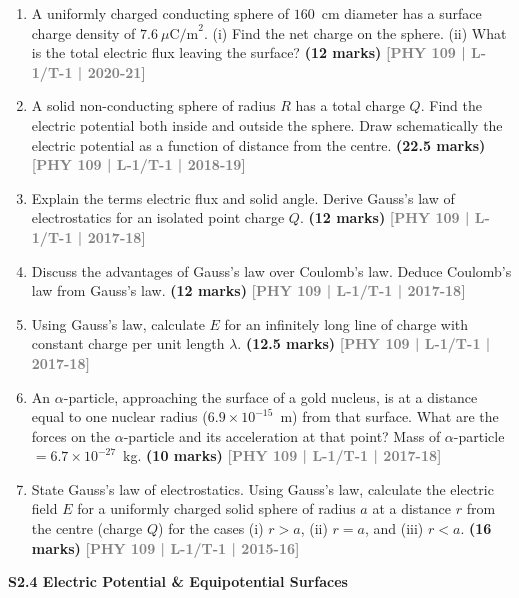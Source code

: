 \documentclass[12pt,a3paper]{article}
\newcommand{\yr}[1]{\hfill\textcolor{gray}{\small\textbf{[#1]}}}
\newcommand{\mk}[1]{\textcolor{orange!70!black}{\small\textbf{(#1 marks)}}}
\newcommand{\subtopic}[2]{%
  \vspace{10pt}
  \noindent\begin{tcolorbox}[colback=#1!8,colframe=#1,boxrule=0.6pt,arc=4pt,
    left=6pt,right=6pt,top=4pt,bottom=4pt]
    \small\bfseries\textcolor{#1}{#2}
  \end{tcolorbox}
  \vspace{2pt}
}
\begin{document}
\begin{enumerate}

\item A uniformly charged conducting sphere of $160$~cm diameter has a surface charge density of $7.6\ \mu\text{C/m}^2$. (i) Find the net charge on the sphere. (ii) What is the total electric flux leaving the surface?
\mk{12} \yr{PHY 109 | L-1/T-1 | 2020-21}

\item A solid non-conducting sphere of radius $R$ has a total charge $Q$. Find the electric potential both inside and outside the sphere. Draw schematically the electric potential as a function of distance from the centre.
\mk{22.5} \yr{PHY 109 | L-1/T-1 | 2018-19}

\item Explain the terms electric flux and solid angle. Derive Gauss's law of electrostatics for an isolated point charge $Q$.
\mk{12} \yr{PHY 109 | L-1/T-1 | 2017-18}

\item Discuss the advantages of Gauss's law over Coulomb's law. Deduce Coulomb's law from Gauss's law.
\mk{12} \yr{PHY 109 | L-1/T-1 | 2017-18}

\item Using Gauss's law, calculate $E$ for an infinitely long line of charge with constant charge per unit length $\lambda$.
\mk{12.5} \yr{PHY 109 | L-1/T-1 | 2017-18}

\item An $\alpha$-particle, approaching the surface of a gold nucleus, is at a distance equal to one nuclear radius ($6.9\times10^{-15}$~m) from that surface. What are the forces on the $\alpha$-particle and its acceleration at that point? Mass of $\alpha$-particle $= 6.7\times10^{-27}$~kg.
\mk{10} \yr{PHY 109 | L-1/T-1 | 2017-18}

\item State Gauss's law of electrostatics. Using Gauss's law, calculate the electric field $E$ for a uniformly charged solid sphere of radius $a$ at a distance $r$ from the centre (charge $Q$) for the cases (i) $r>a$, (ii) $r=a$, and (iii) $r<a$.
\mk{16} \yr{PHY 109 | L-1/T-1 | 2015-16}


\end{enumerate}


\label{sec:s24}
\subtopic{cA}{S2.4 \quad Electric Potential \& Equipotential Surfaces}
\end{document}
